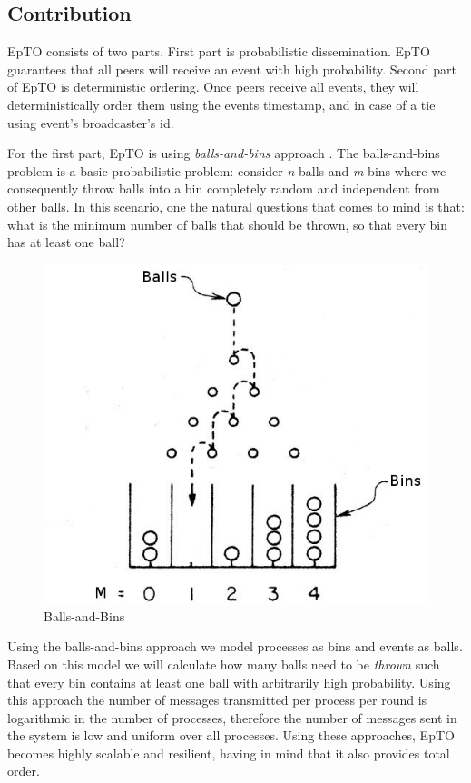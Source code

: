 \documentclass[10pt,conference,a4paper]{IEEEtran}
\begin{document}
\subsection{Contribution}
EpTO consists of two parts. First part is probabilistic dissemination. EpTO guarantees that all peers will receive an event with high probability. Second part of EpTO is deterministic ordering. Once peers receive all events, they will deterministically order them using the events timestamp, and in case of a tie using event's broadcaster's id.
\par
For the first part, EpTO is using \textit{balls-and-bins} approach \autocite{Koldehofe02simplegossiping}. The balls-and-bins problem is a basic probabilistic problem: consider \textit{n} balls and \textit{m} bins where we consequently throw balls into a bin completely random and independent from other balls. In this scenario, one the natural questions that comes to mind is that: what is the minimum number of balls that should be thrown, so that every bin has at least one ball?
\begin{figure}
\includegraphics[width=\linewidth]{figures/BnB.jpeg}
\caption{Balls-and-Bins}
\label{fig:balls-and-bins}
\end{figure}
\par
Using the balls-and-bins approach we model processes as bins and events as balls. Based on this model we will calculate how many balls need to be \textit{thrown} such that every bin contains at least one ball with arbitrarily high probability. Using this approach the number of messages transmitted per process per round is logarithmic in the number of processes, therefore the number of messages sent in the system is low and uniform over all processes. Using these approaches, EpTO becomes highly scalable and resilient, having in mind that it also provides total order.
\end{document}
